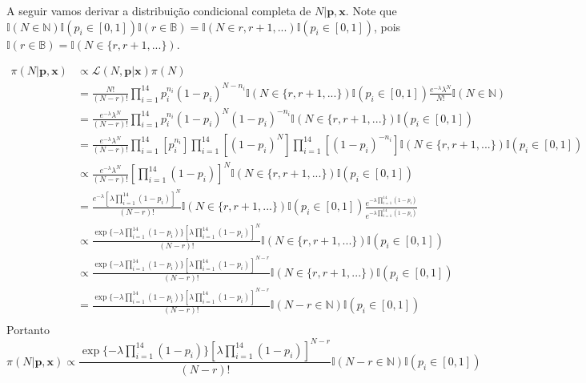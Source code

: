 \documentclass[a4paper,12pt,twoside]{article}
\begin{document}
A seguir vamos derivar a distribuição condicional completa de $N|\mathbf{p,x}$. Note que $\mathds{I}(N \in \mathbb{N})\mathds{I}(p_i \in [0,1])\mathds{I}(r \in \mathbb{B})=\mathds{I}(N \in {r,r+1,...})\mathds{I}(p_i \in [0,1])$, pois $\mathds{I}(r \in \mathbb{B})=\mathds{I}(N \in \{r,r+1,...\})$.

\begin{align*}
\pi(N|\mathbf{p,x})&\propto \mathcal{L}(N,\mathbf{p}|\mathbf{x}) \pi(N)\\
&= \frac{N!}{(N-r)!}\prod_{i=1}^{14}p_{i}^{n_i}(1-p_i)^{N-n_i}\mathds{I}(N \in \{r,r+1,...\})\mathds{I}(p_i \in [0,1])\frac{e^{-\lambda}\lambda^{N}}{N!} \mathds{I}(N \in \mathbb{N})\\
&=\frac{e^{-\lambda}\lambda^{N}}{(N-r)!}\prod_{i=1}^{14}p_{i}^{n_i}(1-p_i)^{N}(1-p_i)^{-n_i}\mathds{I}(N \in \{r,r+1,...\})\mathds{I}(p_i \in [0,1])\\
&=\frac{e^{-\lambda}\lambda^{N}}{(N-r)!}\prod_{i=1}^{14}\left[p_{i}^{n_i}\right]\prod_{i=1}^{14}\left[(1-p_i)^{N}\right]\prod_{i=1}^{14}\left[(1-p_i)^{-n_i}\right]\mathds{I}(N \in \{r,r+1,...\})\mathds{I}(p_i \in [0,1])\\
& \propto \frac{e^{-\lambda}\lambda^{N}}{(N-r)!}\left[\prod_{i=1}^{14}(1-p_i)\right]^{N}\mathds{I}(N \in \{r,r+1,...\})\mathds{I}(p_i \in [0,1])\\
& = \frac{e^{-\lambda}\left[\lambda\prod_{i=1}^{14}(1-p_i)\right]^{N}}{(N-r)!}\mathds{I}(N \in \{r,r+1,...\})\mathds{I}(p_i \in [0,1])\frac{e^{-\lambda\prod_{i=1}^{14}(1-p_i)}}{e^{-\lambda\prod_{i=1}^{14}(1-p_i)}}\\
& \propto \frac{\exp\{-\lambda\prod_{i=1}^{14}(1-p_i)\}\left[\lambda\prod_{i=1}^{14}(1-p_i)\right]^{N}}{(N-r)!}\mathds{I}(N \in \{r,r+1,...\})\mathds{I}(p_i \in [0,1])\\
& \propto \frac{\exp\{-\lambda\prod_{i=1}^{14}(1-p_i)\}\left[\lambda\prod_{i=1}^{14}(1-p_i)\right]^{N-r}}{(N-r)!}\mathds{I}(N \in \{r,r+1,...\})\mathds{I}(p_i \in [0,1])\\
& = \frac{\exp\{-\lambda\prod_{i=1}^{14}(1-p_i)\}\left[\lambda\prod_{i=1}^{14}(1-p_i)\right]^{N-r}}{(N-r)!}\mathds{I}(N-r \in \mathbb{N})\mathds{I}(p_i \in [0,1])\\
\end{align*}
Portanto
\begin{equation}\label{piN}
\pi(N|\mathbf{p,x})\propto \frac{\exp\{-\lambda\prod_{i=1}^{14}(1-p_i)\}\left[\lambda\prod_{i=1}^{14}(1-p_i)\right]^{N-r}}{(N-r)!}\mathds{I}(N-r \in \mathbb{N})\mathds{I}(p_i \in [0,1])
\end{equation}
\end{document}
